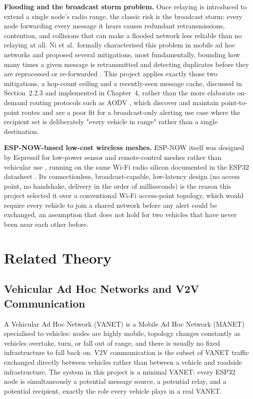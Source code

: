 \documentclass[12pt,a4paper]{report}
\begin{document}
\textbf{Flooding and the broadcast storm problem.} Once relaying is introduced to extend a single node's radio range, the classic risk is the broadcast storm: every node forwarding every message it hears causes redundant retransmissions, contention, and collisions that can make a flooded network less reliable than no relaying at all. Ni et al.\ formally characterised this problem in mobile ad hoc networks and proposed several mitigations, most fundamentally, bounding how many times a given message is retransmitted and detecting duplicates before they are reprocessed or re-forwarded \cite{ni1999broadcaststorm}. This project applies exactly those two mitigations, a hop-count ceiling and a recently-seen message cache, discussed in Section~2.2.3 and implemented in Chapter~4, rather than the more elaborate on-demand routing protocols such as AODV \cite{perkins2003aodv}, which discover and maintain point-to-point routes and are a poor fit for a broadcast-only alerting use case where the recipient set is deliberately "every vehicle in range" rather than a single destination.

\textbf{ESP-NOW-based low-cost wireless meshes.} ESP-NOW itself was designed by Espressif for low-power sensor and remote-control meshes rather than vehicular use \cite{espressif_espnow}, running on the same Wi-Fi radio silicon documented in the ESP32 datasheet \cite{espressif_esp32}. Its connectionless, broadcast-capable, low-latency design (no access point, no handshake, delivery in the order of milliseconds) is the reason this project selected it over a conventional Wi-Fi access-point topology, which would require every vehicle to join a shared network before any alert could be exchanged, an assumption that does not hold for two vehicles that have never been near each other before.

\section{Related Theory}

\subsection{Vehicular Ad Hoc Networks and V2V Communication}
A Vehicular Ad Hoc Network (VANET) is a Mobile Ad Hoc Network (MANET) specialised to vehicles: nodes are highly mobile, topology changes constantly as vehicles overtake, turn, or fall out of range, and there is usually no fixed infrastructure to fall back on. V2V communication is the subset of VANET traffic exchanged directly between vehicles rather than between a vehicle and roadside infrastructure. The system in this project is a minimal VANET: every ESP32 node is simultaneously a potential message source, a potential relay, and a potential recipient, exactly the role every vehicle plays in a real VANET.
\end{document}
